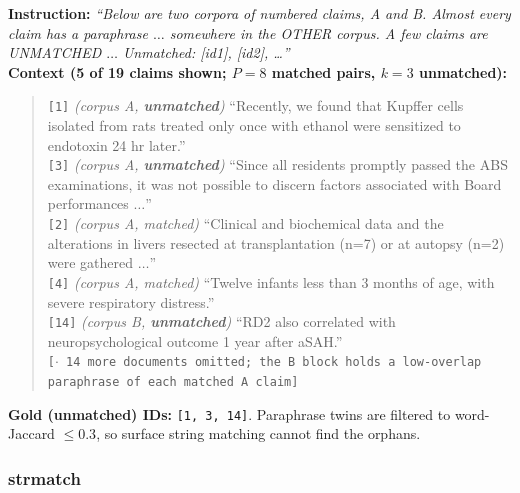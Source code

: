 \textbf{Instruction:} \emph{``Below are two corpora of numbered claims, A and B. Almost every claim
has a paraphrase $\dots$ somewhere in the OTHER corpus. A few claims are UNMATCHED $\dots$ Unmatched:
[id1], [id2], \dots''}\\
\textbf{Context (5 of 19 claims shown; $P{=}8$ matched pairs, $k{=}3$ unmatched):}
\begin{quote}\small
\texttt{[1]} \emph{(corpus A, \textbf{unmatched})} ``Recently, we found that Kupffer cells isolated
from rats treated only once with ethanol were sensitized to endotoxin 24 hr later.''\\
\texttt{[3]} \emph{(corpus A, \textbf{unmatched})} ``Since all residents promptly passed the ABS
examinations, it was not possible to discern factors associated with Board performances $\dots$''\\
\texttt{[2]} \emph{(corpus A, matched)} ``Clinical and biochemical data and the alterations in livers
resected at transplantation (n=7) or at autopsy (n=2) were gathered $\dots$''\\
\texttt{[4]} \emph{(corpus A, matched)} ``Twelve infants less than 3 months of age, with severe
respiratory distress.''\\
\texttt{[14]} \emph{(corpus B, \textbf{unmatched})} ``RD2 also correlated with neuropsychological
outcome 1 year after aSAH.''\\
\texttt{[$\cdot$ 14 more documents omitted; the B block holds a low-overlap paraphrase of each
matched A claim]}
\end{quote}
\textbf{Gold (unmatched) IDs:} \texttt{[1, 3, 14]}. Paraphrase twins are filtered to word-Jaccard
$\leq 0.3$, so surface string matching cannot find the orphans.

\subsubsection{strmatch}

